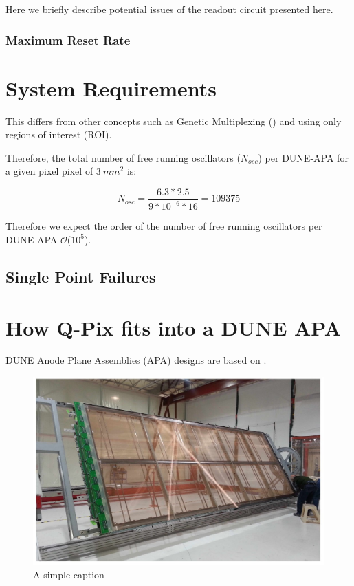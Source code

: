 Here we briefly describe potential issues of the readout circuit presented here.

\subsubsection{Maximum Reset Rate}



\section{System Requirements}

This differs from other concepts such as Genetic Multiplexing (\citep{PROCUREUR2013888_genetic_multiplexing}) and using only regions of interest (ROI).

Therefore, the total number of free running oscillators ($N_{osc}$) per DUNE-APA for a given pixel pixel of $3~mm^{2}$ is:

\begin{equation}
N_{osc} = \frac{6.3 * 2.5}{9*10^{-6}*16} = 109375
\end{equation}

Therefore we expect the order of the number of free running oscillators per DUNE-APA $\mathcal{O}$($10^5$).

\subsection{Single Point Failures}

\section{How Q-Pix fits into a DUNE APA}

DUNE Anode Plane Assemblies (APA) designs are based on \citep{DUNE-FD_TDRv4:Abi_2020}.

\begin{figure}[]
\centering
\includegraphics[width=\textwidth]{images/dune_fd_tdr_apa_image.jpg}
\caption{A simple caption \citep{DUNE-FD_TDRv4:Abi_2020}}
\end{figure}
